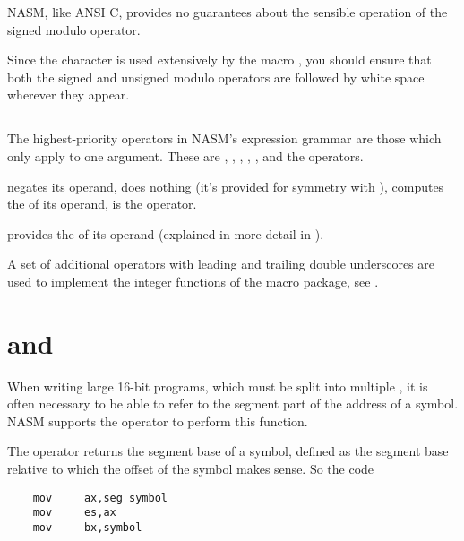 NASM, like ANSI C, provides no guarantees about the sensible
operation of the signed modulo operator.

Since the \code{\%} character is used extensively by the macro
, you should ensure that both the signed
and unsigned modulo operators are followed by white space wherever
they appear.

\subsection{}
\label{subsec:expmul}

The highest-priority operators in NASM's expression grammar are those
which only apply to one argument. These are \code{+},
\code{-}, \codeindex{\textasciitilde},
\code{!}, , and the
 operators.

\code{-} negates its operand, \code{+} does nothing (it's provided for
symmetry with \code{-}), \code{\textasciitilde} computes the
 of its operand, \code{!} is the
 operator.

 provides the 
of its operand (explained in more detail in ).

A set of additional operators with leading and trailing double
underscores are used to implement the integer functions of the
 macro package, see .

\section{ and }
\label{sec:segwrt}

When writing large 16-bit programs, which must be split into
multiple , it is often necessary to be able
to refer to the segment part of the address
of a symbol. NASM supports the  operator to perform
this function.

The  operator returns the \emph{}
segment base of a symbol, defined as the segment base relative
to which the offset of the symbol makes sense. So the code

\begin{lstlisting}
	mov     ax,seg symbol
	mov     es,ax
	mov     bx,symbol
\end{lstlisting}

